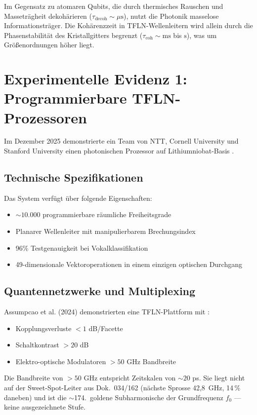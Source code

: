 	Im Gegensatz zu atomaren Qubits, die durch thermisches Rauschen und Masseträgheit dekohärieren ($\tau_{\text{decoh}} \sim \mu\text{s}$), nutzt die Photonik masselose Informationsträger. Die Kohärenzzeit in TFLN-Wellenleitern wird allein durch die Phasenstabilität des Kristallgitters begrenzt ($\tau_{\text{coh}} \sim \text{ms}$ bis $\text{s}$), was um Größenordnungen höher liegt.
	
	\section{Experimentelle Evidenz 1: Programmierbare TFLN-Prozessoren}
	
	Im Dezember 2025 demonstrierte ein Team von NTT, Cornell University und Stanford University einen photonischen Prozessor auf Lithiumniobat-Basis \cite{NTT2025}.
	
	\subsection{Technische Spezifikationen}
	
	Das System verfügt über folgende Eigenschaften:
	\begin{itemize}
		\item $\sim 10.000$ programmierbare räumliche Freiheitsgrade
		\item Planarer Wellenleiter mit manipulierbarem Brechungsindex
		\item 96\% Testgenauigkeit bei Vokalklassifikation
		\item 49-dimensionale Vektoroperationen in einem einzigen optischen Durchgang
	\end{itemize}
	
	\subsection{Quantennetzwerke und Multiplexing}
	\label{sec:186_multiplex}
	
	Assumpcao et al. (2024) demonstrierten eine TFLN-Plattform mit \cite{Assumpcao2024}:
	\begin{itemize}
		\item Kopplungsverluste $< 1$ dB/Facette
		\item Schaltkontrast $> 20$ dB
		\item Elektro-optische Modulatoren $> 50$ GHz Bandbreite
	\end{itemize}
	
	Die Bandbreite von $>50$ GHz entspricht Zeitskalen von $\sim 20$ ps. Sie liegt nicht auf der Sweet-Spot-Leiter aus Dok.~034/162 (nächste Sprosse 42,8~GHz, 14\,\% daneben) und ist die $\sim$174.\ goldene Subharmonische der Grundfrequenz $f_0$ --- keine ausgezeichnete Stufe.
	
